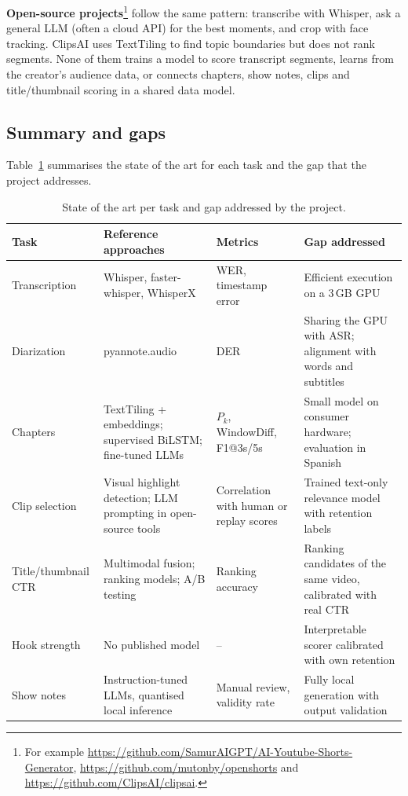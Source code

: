\documentclass[ENG]{TFUOC}
\begin{document}
\textbf{Open-source projects}\footnote{For example \url{https://github.com/SamurAIGPT/AI-Youtube-Shorts-Generator}, \url{https://github.com/mutonby/openshorts} and \url{https://github.com/ClipsAI/clipsai}.} follow the same pattern: transcribe with Whisper, ask a general LLM (often a cloud API) for the best moments, and crop with face tracking. ClipsAI uses TextTiling to find topic boundaries but does not rank segments. None of them trains a model to score transcript segments, learns from the creator's audience data, or connects chapters, show notes, clips and title/thumbnail scoring in a shared data model.

\subsection{Summary and gaps}
\label{ss:soa-conclusions}

Table~\ref{tab:soa-summary} summarises the state of the art for each task and the gap that the project addresses.

\begin{table}[H]
\centering
\caption{State of the art per task and gap addressed by the project.}
\label{tab:soa-summary}
\small
\begin{tabular}{@{}p{2.4cm}p{4.4cm}p{3.2cm}p{5.5cm}@{}}
\toprule
\textbf{Task} & \textbf{Reference approaches} & \textbf{Metrics} & \textbf{Gap addressed} \\
\midrule
Transcription & Whisper, faster-whisper, WhisperX & WER, timestamp error & Efficient execution on a 3\,GB GPU \\
Diarization & pyannote.audio & DER & Sharing the GPU with ASR; alignment with words and subtitles \\
Chapters & TextTiling + embeddings; supervised BiLSTM; fine-tuned LLMs & $P_k$, WindowDiff, F1@3s/5s & Small model on consumer hardware; evaluation in Spanish \\
Clip selection & Visual highlight detection; LLM prompting in open-source tools & Correlation with human or replay scores & Trained text-only relevance model with retention labels \\
Title/thumbnail CTR & Multimodal fusion; ranking models; A/B testing & Ranking accuracy & Ranking candidates of the same video, calibrated with real CTR \\
Hook strength & No published model & -- & Interpretable scorer calibrated with own retention \\
Show notes & Instruction-tuned LLMs, quantised local inference & Manual review, validity rate & Fully local generation with output validation \\
\bottomrule
\end{tabular}
\end{table}
\end{document}
